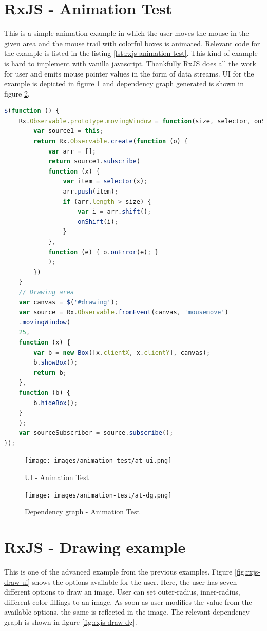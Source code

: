 \section{RxJS - Animation Test}
This is a simple animation example in which the user moves the mouse in the given area and the mouse trail with colorful boxes is animated. Relevant code for the example is listed in the listing \ref{lst:rxjs-animation-test}. This kind of example is hard to implement with vanilla javascript. Thankfully RxJS does all the work for user and emits mouse pointer values in the form of data streams. UI for the example is depicted in figure \ref{fig:rxjs-at-ui} and dependency graph generated is shown in figure \ref{fig:rxjs-at-dg}.

\begin{lstlisting}[language=JavaScript, caption=RxJS - Animation Test example, label={lst:rxjs-animation-test}]	
$(function () {
	Rx.Observable.prototype.movingWindow = function(size, selector, onShift) {
		var source1 = this;
		return Rx.Observable.create(function (o) {
			var arr = [];
			return source1.subscribe(
			function (x) {
				var item = selector(x);
				arr.push(item);
				if (arr.length > size) {
					var i = arr.shift();
					onShift(i);
				}
			},
			function (e) { o.onError(e); }
			);
		})
	}
	// Drawing area
	var canvas = $('#drawing');
	var source = Rx.Observable.fromEvent(canvas, 'mousemove')
	.movingWindow(
	25,
	function (x) {
		var b = new Box([x.clientX, x.clientY], canvas);
		b.showBox();
		return b;
	},
	function (b) {
		b.hideBox();
	}
	);	
	var sourceSubscriber = source.subscribe();	
});
\end{lstlisting}

\begin{figure}[!h]
	\centering
	\texttt{[image: images/animation-test/at-ui.png]}
	\caption{UI - Animation Test}
	\label{fig:rxjs-at-ui}
\end{figure}
\begin{figure}[!h]
	\centering
	\texttt{[image: images/animation-test/at-dg.png]}
	\caption{Dependency graph - Animation Test}
	\label{fig:rxjs-at-dg}
\end{figure}

\section{RxJS - Drawing example}
This is one of the advanced example from the previous examples. Figure \ref{fig:rxjs-draw-ui} shows the options available for the user. Here, the user has seven different options to draw an image. User can set outer-radius, inner-radius, different color fillings to an image. As soon as user modifies the value from the available options, the same is reflected in the image. The relevant dependency graph is shown in figure \ref{fig:rxjs-draw-dg}.

